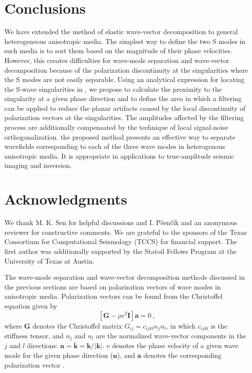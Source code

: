 \section{Conclusions}
We have extended the method of elastic wave-vector decomposition to general heterogeneous anisotropic media.
The simplest way to define the two S modes in such media is to sort them based on the magnitude of their phase velocities. However, this creates difficulties for wave-mode separation and wave-vector decomposition because of the polarization discontinuity at the singularities where the S modes are not easily separable. Using an analytical expression for locating the S-wave singularities in , we propose to calculate the proximity to the singularity at a given phase direction and to define the area in which a filtering can be applied to reduce the planar artifacts caused by the local discontinuity of polarization vectors at the singularities. The amplitudes affected by the filtering process are additionally compensated by the technique of local signal-noise orthogonalization.  the proposed method presents an effective way to separate wavefields corresponding to each of the three wave modes in heterogenous anisotropic media. It is appropriate in applications to true-amplitude seismic imaging and inversion.

\section{Acknowledgments}
We thank M. K. Sen for helpful discussions and I. P\v{s}en\v{c}\'{i}k and an anonymous reviewer for constructive comments.
We are grateful to the sponsors of the Texas Consortium for Computational Seismology (TCCS) for financial support. The first author was additionally supported by the Statoil Fellows Program at the University of Texas at Austin.


The wave-mode separation and wave-vector decomposition methods discussed in the previous sections are based on polarization vectors of wave modes in anisotropic media. Polarization vectors can be found from the Christoffel equation given by
\begin{equation}
	\left[\mathbf{G}-\rho v^2 \mathbf{I}  \right]\mathbf{a} = 0~,
\end{equation}
where $\mathbf{G}$ denotes the Christoffel matrix $G_{ij} = c_{ijkl}n_{j}n_{l}$, in which $c_{ijkl}$ is the stiffness tensor, and $n_j$ and $n_l$
are the normalized wave-vector components in the $j$ and $l$ directions: $\mathbf{n} = \mathbf{\bar{k}} = \mathbf{k}/|\mathbf{k}|$. $v$ denotes the phase velocity of a given wave mode for the given phase direction ($\mathbf{n}$), and $\mathbf{a}$ denotes the corresponding polarization vector \cite[]{cerveny}.


